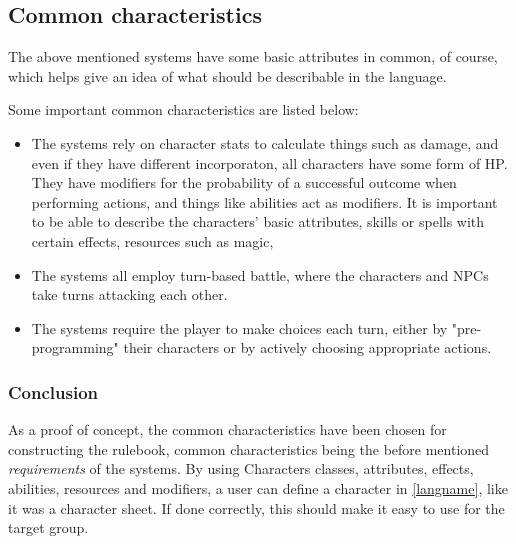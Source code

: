 \subsection*{Common characteristics}
\label{baseclasses}
The above mentioned systems have some basic attributes in common, of course, which helps give an idea of what should be describable in the language.

Some important common characteristics are listed below:
\begin{itemize}
	\item The systems rely on character stats to calculate things such as damage, and even if they have different incorporaton, all characters have some form of HP. They have modifiers for the probability of a successful outcome when performing actions, and things like abilities act as modifiers. It is important to be able to describe the characters' basic attributes, skills or spells with certain effects, resources such as magic, 
	\item The systems all employ turn-based battle, where the characters and NPCs take turns attacking each other. 
	\item The systems require the player to make choices each turn, either by "pre-programming" their characters or by actively choosing appropriate actions.
\end{itemize} 

\subsubsection*{Conclusion}
As a proof of concept, the common characteristics have been chosen for constructing the rulebook, common characteristics being the before mentioned \emph{requirements} of the systems.
By using Characters classes, attributes, effects, abilities, resources and modifiers, a user can define a character in \ref{langname}, like it was a character sheet. If done correctly, this should make it easy to use for the target group.



